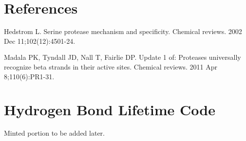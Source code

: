 \documentclass[11pt, twocolumn]{article}
\begin{document}
\section{References}
\begin{thebibliography}{9}
Hedstrom L. Serine protease mechanism and specificity.
Chemical reviews. 2002 Dec 11;102(12):4501-24.

Madala PK, Tyndall JD, Nall T, Fairlie DP.
Update 1 of: Proteases universally recognize beta strands in their active sites.
Chemical reviews. 2011 Apr 8;110(6):PR1-31.


\end{thebibliography}

\appendix

\onecolumn

\section{Hydrogen Bond Lifetime Code}

Minted portion to be added later.
\end{document}
